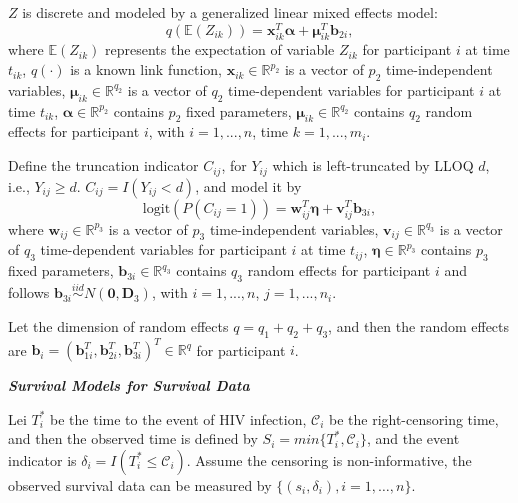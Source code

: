 $Z$ is discrete and modeled by a generalized linear mixed effects model:
\begin{equation}
    q(\mathbb{E}(Z_{ik})) = \boldsymbol{x}_{ik}^T \boldsymbol{\alpha} + \boldsymbol{\mu}_{ik}^T \boldsymbol{b}_{2i},
\end{equation}
where $\mathbb{E}(Z_{ik})$ represents the expectation of variable $Z_{ik}$ for participant $i$ at time $t_{ik}$, $q(\cdot)$ is a known link function, $\boldsymbol{x}_{ik}\in \mathbb{R}^{p_2}$ is a vector of $p_2$ time-independent variables, $ \boldsymbol{\mu}_{ik}\in \mathbb{R}^{q_2}$ is a vector of $q_2$ time-dependent variables for participant $i$ at time $t_{ik}$, $\boldsymbol{\alpha}\in \mathbb{R}^{p_2}$ contains $p_2$ fixed parameters, $\boldsymbol{\mu}_{ik}\in \mathbb{R}^{q_2}$ contains $q_2$ random effects for participant $i$, with $i=1,...,n$, time $k=1,...,m_i$.

Define the truncation indicator $C_{ij}$, for $Y_{ij}$ which is left-truncated by LLOQ $d$, i.e., $Y_{ij}\geq d$. 
$C_{ij} = I(Y_{ij}<d)$, and model it by
\begin{equation}
    \text{logit}(P(C_{ij} = 1)) = \boldsymbol{w}_{ij}^T \boldsymbol{\eta} + \boldsymbol{v}_{ij}^T \boldsymbol{b}_{3i},
\end{equation}
where $\boldsymbol{w}_{ij}\in \mathbb{R}^{p_3}$ is a vector of $p_3$ time-independent variables, $\boldsymbol{v}_{ij}\in \mathbb{R}^{q_3}$ is a vector of $q_3$ time-dependent variables for participant $i$ at time $t_{ij}$, $\boldsymbol{\eta}\in \mathbb{R}^{p_3}$ contains $p_3$ fixed parameters, $\boldsymbol{b}_{3i}\in \mathbb{R}^{q_3}$ contains $q_3$ random effects for participant $i$ and follows $\boldsymbol{b}_{3i}\stackrel{iid}{\sim} N(\boldsymbol{0}, \boldsymbol{D}_3)$, with $i=1,...,n$, $j=1,...,n_i$. 


Let the dimension of random effects $q=q_1+q_2+q_3$, and then the random effects are $\boldsymbol{b}_i = (\boldsymbol{b}_{1i}^T, \boldsymbol{b}_{2i}^T, \boldsymbol{b}_{3i}^T)^T \in \mathbb{R}^{q}$ for participant $i$.



\vspace{2mm}
\noindent \textbf{\textit{Survival Models for Survival Data}}
\vspace{2mm}

Lei $T_i^{\ast}$ be the time to the event of HIV infection, $\mathcal{C}_i$ be the right-censoring time, and then the observed time is defined by $S_i = min\{ T_i^{\ast}, \mathcal{C}_i\}$, and the event indicator is $\delta_i = I(T_i^{\ast} \leq \mathcal{C}_i)$. Assume the censoring is non-informative, the observed survival data can be measured by $\{(s_i, \delta_i),i=1,\dots,n \}$.

